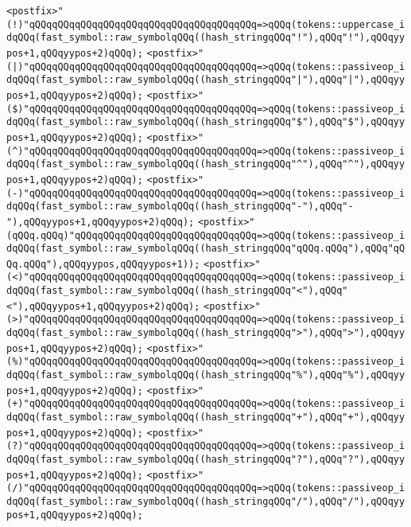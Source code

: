 \verb|<postfix>"(!)"qQQqqQQqqQQqqQQqqQQqqQQqqQQqqQQqqQQqqQQq=>qQQq(tokens::uppercase_idqQQq(fast_symbol::raw_symbolqQQq((hash_stringqQQq"!"),qQQq"!"),qQQqyypos+1,qQQqyypos+2)qQQq);|\newline
\verb|<postfix>"(|\verb#|)"qQQqqQQqqQQqqQQqqQQqqQQqqQQqqQQqqQQqqQQq=>qQQq(tokens::passiveop_idqQQq(fast_symbol::raw_symbolqQQq((hash_stringqQQq"|"),qQQq"|"),qQQqyypos+1,qQQqyypos+2)qQQq);#\newline
\verb|<postfix>"($)"qQQqqQQqqQQqqQQqqQQqqQQqqQQqqQQqqQQqqQQq=>qQQq(tokens::passiveop_idqQQq(fast_symbol::raw_symbolqQQq((hash_stringqQQq"$"),qQQq"$"),qQQqyypos+1,qQQqyypos+2)qQQq);|\newline
\verb|<postfix>"(^)"qQQqqQQqqQQqqQQqqQQqqQQqqQQqqQQqqQQqqQQq=>qQQq(tokens::passiveop_idqQQq(fast_symbol::raw_symbolqQQq((hash_stringqQQq"^"),qQQq"^"),qQQqyypos+1,qQQqyypos+2)qQQq);|\newline
\verb|<postfix>"(-)"qQQqqQQqqQQqqQQqqQQqqQQqqQQqqQQqqQQqqQQq=>qQQq(tokens::passiveop_idqQQq(fast_symbol::raw_symbolqQQq((hash_stringqQQq"-"),qQQq"-"),qQQqyypos+1,qQQqyypos+2)qQQq);|\newline
\verb|<postfix>"(qQQq.qQQq)"qQQqqQQqqQQqqQQqqQQqqQQqqQQqqQQq=>qQQq(tokens::passiveop_idqQQq(fast_symbol::raw_symbolqQQq((hash_stringqQQq"qQQq.qQQq"),qQQq"qQQq.qQQq"),qQQqyypos,qQQqyypos+1));|\newline
\verb|<postfix>"(<)"qQQqqQQqqQQqqQQqqQQqqQQqqQQqqQQqqQQqqQQq=>qQQq(tokens::passiveop_idqQQq(fast_symbol::raw_symbolqQQq((hash_stringqQQq"<"),qQQq"<"),qQQqyypos+1,qQQqyypos+2)qQQq);|\newline
\verb|<postfix>"(>)"qQQqqQQqqQQqqQQqqQQqqQQqqQQqqQQqqQQqqQQq=>qQQq(tokens::passiveop_idqQQq(fast_symbol::raw_symbolqQQq((hash_stringqQQq">"),qQQq">"),qQQqyypos+1,qQQqyypos+2)qQQq);|\newline
\verb|<postfix>"(%)"qQQqqQQqqQQqqQQqqQQqqQQqqQQqqQQqqQQqqQQq=>qQQq(tokens::passiveop_idqQQq(fast_symbol::raw_symbolqQQq((hash_stringqQQq"%"),qQQq"%"),qQQqyypos+1,qQQqyypos+2)qQQq);|\newline
\verb|<postfix>"(+)"qQQqqQQqqQQqqQQqqQQqqQQqqQQqqQQqqQQqqQQq=>qQQq(tokens::passiveop_idqQQq(fast_symbol::raw_symbolqQQq((hash_stringqQQq"+"),qQQq"+"),qQQqyypos+1,qQQqyypos+2)qQQq);|\newline
\verb|<postfix>"(?)"qQQqqQQqqQQqqQQqqQQqqQQqqQQqqQQqqQQqqQQq=>qQQq(tokens::passiveop_idqQQq(fast_symbol::raw_symbolqQQq((hash_stringqQQq"?"),qQQq"?"),qQQqyypos+1,qQQqyypos+2)qQQq);|\newline
\verb|<postfix>"(/)"qQQqqQQqqQQqqQQqqQQqqQQqqQQqqQQqqQQqqQQq=>qQQq(tokens::passiveop_idqQQq(fast_symbol::raw_symbolqQQq((hash_stringqQQq"/"),qQQq"/"),qQQqyypos+1,qQQqyypos+2)qQQq);|\newline
